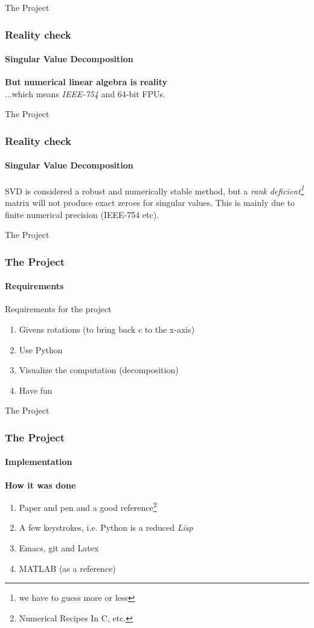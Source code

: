 \documentclass{beamer}
\begin{document}

\begin{frame}{The Project}

\frametitle{Reality check}
\framesubtitle{Singular Value Decomposition}

\textbf{But numerical linear algebra is reality}\\...which means \emph{IEEE-754} and
64-bit FPUs.

\end{frame}


\begin{frame}{The Project}

\frametitle{Reality check}
\framesubtitle{Singular Value Decomposition}

SVD is considered a robust and numerically stable method, but a \emph{rank deficient\footnote{we have to guess more or less}} matrix will not produce exact zeroes for singular values. This is mainly due to finite numerical precision (IEEE-754 etc).

\end{frame}


\begin{frame}{The Project}

\frametitle{The Project}
\framesubtitle{Requirements}

Requirements for the project
\begin{enumerate}
\item Givens rotations (to bring back $c$ to the x-axis)
\item Use Python
\item Visualize the computation (decomposition)
\item Have fun
\end{enumerate}

\end{frame}


\begin{frame}{The Project}

\frametitle{The Project}
\framesubtitle{Implementation}

\textbf{How it was done}
\begin{enumerate}
\item Paper and pen and a good reference\footnote{Numerical Recipes In C, etc.}
\item A few keystrokes, i.e. Python is a reduced \emph{Lisp}
\item Emacs, git and Latex
\item MATLAB (as a reference)
\end{enumerate}


\end{frame}
\end{document}
